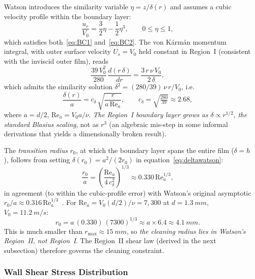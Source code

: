 \documentclass[aps,prfluids,reprint,amsmath,amssymb,floatfix]{revtex4-2}
\newcommand{\Rey}{\mathrm{Re}}
\begin{document}
Watson introduces the similarity variable $\eta = z/\delta(r)$ and assumes
a cubic velocity profile within the boundary layer:
\begin{equation}
    \frac{u_r}{V_0} = \frac{3}{2}\eta - \frac{1}{2}\eta^3,
    \qquad 0 \leq \eta \leq 1,
    \label{eq:cubicprofile}
\end{equation}
which satisfies both~\eqref{eq:BC1} and~\eqref{eq:BC2}. The von K\'{a}rm\'{a}n
momentum integral, with outer surface velocity $U_s = V_0$ held constant
in Region~I (consistent with the inviscid outer film), reads
\begin{equation}
    \frac{39\,V_0^2}{280}\,\frac{d(r\,\delta)}{dr}
    = \frac{3\,r\,\nu\,V_0}{2\,\delta},
    \label{eq:karman}
\end{equation}
which admits the similarity solution $\delta^2 = (280/39)\,\nu\,r/V_0$, i.e.
\begin{equation}
    \frac{\delta(r)}{a} = c_\delta\,\sqrt{\frac{r}{a\,\Rey_a}},
    \qquad c_\delta = \sqrt{\tfrac{280}{39}} \approx 2.68,
    \label{eq:deltawatson}
\end{equation}
where $a = d/2$, $\Rey_a = V_0 a/\nu$. \emph{The Region~I boundary layer
grows as $\delta \propto r^{1/2}$, the standard Blasius scaling}, not as
$r^3$ (an algebraic mis-step in some informal derivations that yields a
dimensionally broken result).

The \emph{transition radius} $r_0$, at which the boundary layer spans the
entire film ($\delta = h$), follows from setting $\delta(r_0) = a^2/(2 r_0)$
in equation~\eqref{eq:deltawatson}:
\begin{equation}
    \frac{r_0}{a} = \left(\frac{\Rey_a}{4\,c_\delta^2}\right)^{1/3}
    \approx 0.330\,\Rey_a^{1/3},
    \label{eq:r0}
\end{equation}
in agreement (to within the cubic-profile error) with Watson's original
asymptotic $r_0/a \approx 0.316\,\Rey_a^{1/3}$~\citep{Watson1964}. For
$\Rey_a = V_0(d/2)/\nu = 7{,}300$ at $d = \SI{1.3}{mm}$, $V_0 = \SI{11.2}{m/s}$:
\begin{equation}
    r_0 = a\,(0.330)\,(7300)^{1/3} \approx a \times 6.4
    \approx \SI{4.1}{mm}.
\end{equation}
This is much smaller than $r_\mathrm{max} \approx \SI{15}{mm}$, so
\emph{the cleaning radius lies in Watson's Region~II, not Region~I}.
The Region~II shear law (derived in the next subsection) therefore
governs the cleaning constraint.

\subsubsection{Wall Shear Stress Distribution}
\end{document}
